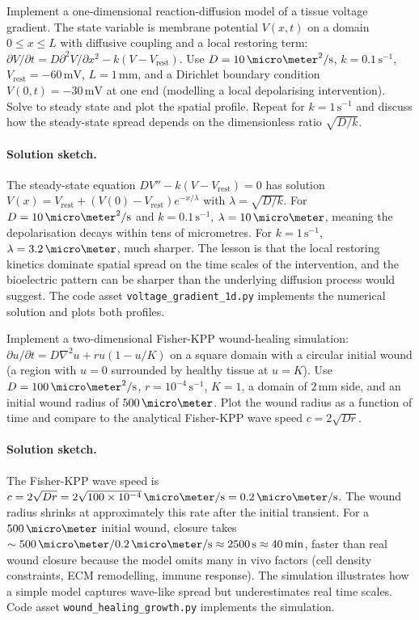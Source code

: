 \begin{exercise}
Implement a one-dimensional reaction-diffusion model of a tissue
voltage gradient. The state variable is membrane potential $V(x, t)$
on a domain $0 \leq x \leq L$ with diffusive coupling and a local
restoring term: $\partial V/\partial t = D \partial^2 V/\partial x^2
- k(V - V_{\text{rest}})$. Use $D = 10\,\micro\meter^2/\text{s}$,
$k = 0.1\,\text{s}^{-1}$, $V_{\text{rest}} = -60\,\text{mV}$,
$L = 1\,\text{mm}$, and a Dirichlet boundary condition
$V(0, t) = -30\,\text{mV}$ at one end (modelling a local
depolarising intervention). Solve to steady state and plot the
spatial profile. Repeat for $k = 1\,\text{s}^{-1}$ and discuss how
the steady-state spread depends on the dimensionless ratio
$\sqrt{D/k}$.

\paragraph{Solution sketch.}
The steady-state equation $D V'' - k(V - V_{\text{rest}}) = 0$ has
solution $V(x) = V_{\text{rest}} + (V(0) - V_{\text{rest}})
e^{-x/\lambda}$ with $\lambda = \sqrt{D/k}$. For
$D = 10\,\micro\meter^2/\text{s}$ and $k = 0.1\,\text{s}^{-1}$,
$\lambda = 10\,\micro\meter$, meaning the depolarisation decays
within tens of micrometres. For $k = 1\,\text{s}^{-1}$, $\lambda =
3.2\,\micro\meter$, much sharper. The lesson is that the local
restoring kinetics dominate spatial spread on the time scales of the
intervention, and the bioelectric pattern can be sharper than the
underlying diffusion process would suggest. The code asset
\texttt{voltage\_gradient\_1d.py} implements the numerical solution
and plots both profiles.
\end{exercise}

\begin{exercise}
Implement a two-dimensional Fisher-KPP wound-healing simulation:
$\partial u/\partial t = D \nabla^2 u + r u (1 - u/K)$ on a square
domain with a circular initial wound (a region with $u = 0$
surrounded by healthy tissue at $u = K$). Use $D =
100\,\micro\meter^2/\text{s}$, $r = 10^{-4}\,\text{s}^{-1}$, $K = 1$,
a domain of $2\,\text{mm}$ side, and an initial wound radius of
$500\,\micro\meter$. Plot the wound radius as a function of time and
compare to the analytical Fisher-KPP wave speed $c = 2\sqrt{Dr}$.

\paragraph{Solution sketch.}
The Fisher-KPP wave speed is $c = 2\sqrt{Dr} = 2\sqrt{100 \times
10^{-4}}\,\micro\meter/\text{s} = 0.2\,\micro\meter/\text{s}$. The
wound radius shrinks at approximately this rate after the initial
transient. For a $500\,\micro\meter$ initial wound, closure takes
$\sim 500\,\micro\meter / 0.2\,\micro\meter/\text{s} \approx
2500\,\text{s} \approx 40\,\text{min}$, faster than real wound
closure because the model omits many in vivo factors (cell density
constraints, ECM remodelling, immune response). The simulation
illustrates how a simple model captures wave-like spread but
underestimates real time scales. Code asset
\texttt{wound\_healing\_growth.py} implements the simulation.
\end{exercise}


